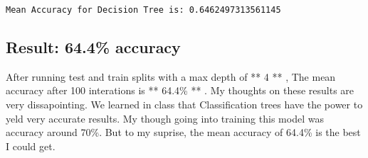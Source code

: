 \documentclass[11pt]{article}
\begin{document}
    \begin{Verbatim}[commandchars=\\\{\}]
Mean Accuracy for Decision Tree is: 0.6462497313561145

    \end{Verbatim}

    \subsection{Result: 64.4\% accuracy}\label{result-64.4-accuracy}

After running test and train splits with a max depth of ** 4 ** , The
mean accuracy after 100 interations is ** 64.4\% ** . My thoughts on
these results are very dissapointing. We learned in class that
Classification trees have the power to yeld very accurate results. My
though going into training this model was accuracy around 70\%. But to
my suprise, the mean accuracy of 64.4\% is the best I could get.


    
    
    
    
\end{document}
